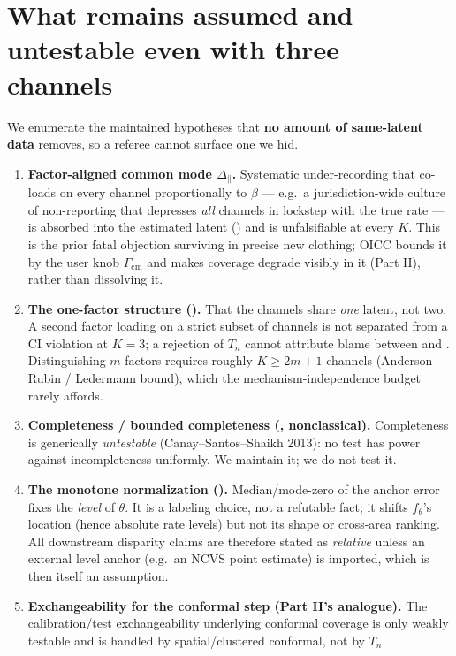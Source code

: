 \documentclass[11pt]{article}
\theoremstyle{definition}
\newcommand{\Th}{\theta}
\newcommand{\lat}{\Th}
\newcommand{\Gcm}{\Gamma_{\mathrm{cm}}}
\newcommand{\Dpar}{\Delta_{\parallel}}
\begin{document}
\section{What remains assumed and untestable even with three channels}
\label{sec:untestable}

We enumerate the maintained hypotheses that \textbf{no amount of same-latent
data} removes, so a referee cannot surface one we hid.

\begin{enumerate}[leftmargin=1.6em,label=\textbf{U\arabic*.}]
\item \textbf{Factor-aligned common mode $\Dpar$.} Systematic under-recording
that co-loads on every channel proportionally to $\beta$ --- e.g.\ a
jurisdiction-wide culture of non-reporting that depresses \emph{all} channels
in lockstep with the true rate --- is absorbed into the estimated latent
() and is unfalsifiable at every $K$. This is the prior
fatal objection surviving in precise new clothing; OICC bounds it by the user
knob $\Gcm$ and makes coverage degrade visibly in it (Part II), rather than
dissolving it.
\item \textbf{The one-factor structure ().} That the channels
share \emph{one} latent, not two. A second factor loading on a strict subset of
channels is not separated from a CI violation at $K=3$; a rejection of $T_n$
cannot attribute blame between  and . Distinguishing
$m$ factors requires roughly $K\ge 2m+1$ channels (Anderson--Rubin /
Ledermann bound), which the mechanism-independence budget rarely affords.
\item \textbf{Completeness / bounded completeness (, nonclassical).}
Completeness is generically \emph{untestable} (Canay--Santos--Shaikh 2013): no
test has power against incompleteness uniformly. We maintain it; we do not test
it.
\item \textbf{The monotone normalization ().} Median/mode-zero of the
anchor error fixes the \emph{level} of $\lat$. It is a labeling choice, not a
refutable fact; it shifts $f_\lat$'s location (hence absolute rate levels) but
not its shape or cross-area ranking. All downstream disparity claims are
therefore stated as \emph{relative} unless an external level anchor (e.g.\ an
NCVS point estimate) is imported, which is then itself an assumption.
\item \textbf{Exchangeability for the conformal step (Part II's 
analogue).} The calibration/test exchangeability underlying conformal coverage
is only weakly testable and is handled by spatial/clustered conformal, not by
$T_n$.
\end{enumerate}
\end{document}

